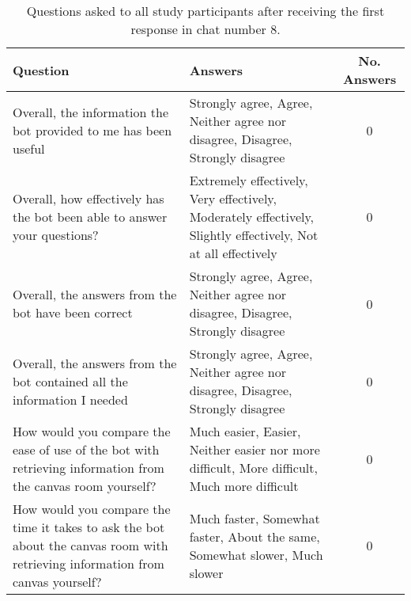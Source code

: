 \renewcommand{\arraystretch}{1.5}
\begin{table}[H]
\centering
{\small
\begin{tabularx}{\textwidth}{@{}X X c@{}}
\toprule
\textbf{Question} & \textbf{Answers} & \textbf{No. Answers} \\ \midrule
Overall, the information the bot provided to me has been useful & Strongly agree, Agree, Neither agree nor disagree, Disagree, Strongly disagree & 0 \\ \hdashline
Overall, how effectively has the bot been able to answer your questions? & Extremely effectively, Very effectively, Moderately effectively, Slightly effectively, Not at all effectively & 0 \\ \hdashline
Overall, the answers from the bot have been correct & Strongly agree, Agree, Neither agree nor disagree, Disagree, Strongly disagree & 0 \\ \hdashline
Overall, the answers from the bot contained all the information I needed & Strongly agree, Agree, Neither agree nor disagree, Disagree, Strongly disagree & 0 \\ \hdashline
How would you compare the ease of use of the bot with retrieving information from the canvas room yourself? & Much easier, Easier, Neither easier nor more difficult, More difficult, Much more difficult & 0 \\ \hdashline
How would you compare the time it takes to ask the bot about the canvas room with retrieving information from canvas yourself? & Much faster, Somewhat faster, About the same, Somewhat slower, Much slower & 0\\
\bottomrule
\end{tabularx}
}
\vspace{2mm}
\caption{Questions asked to all study participants after receiving the first response in chat number 8.}
\label{tab:inserted_questions_8}
\end{table}
